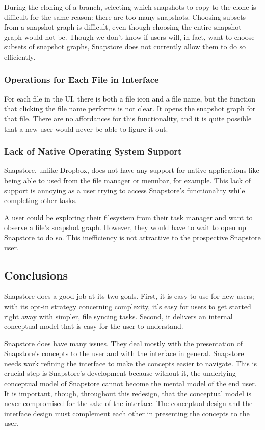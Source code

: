 During the cloning of a branch, selecting which snapshots to copy to the clone is difficult for the same reason: there are too many snapshots. Choosing subsets from a snapshot graph is difficult, even though choosing the entire snapshot graph would not be. Though we don't know if users will, in fact, want to choose subsets of snapshot graphs, Snapstore does not currently allow them to do so efficiently.

\subsubsection{Operations for Each File in Interface}

For each file in the UI, there is both a file icon and a file name, but the function that clicking the file name performs is not clear. It opens the snapshot graph for that file. There are no affordances for this functionality, and it is quite possible that a new user would never be able to figure it out.

\subsubsection{Lack of Native Operating System Support}

Snapstore, unlike Dropbox, does not have any support for native applications like being able to used from the file manager or menubar, for example. This lack of support is annoying as a user trying to access Snapstore's functionality while completing other tasks. 

A user could be exploring their filesystem from their task manager and want to observe a file's snapshot graph. However, they would have to wait to open up Snapstore to do so. This inefficiency is not attractive to the prospective Snapstore user.

\subsection{Conclusions}

Snapstore does a good job at its two goals. First, it is easy to use for new users; with its opt-in strategy concerning complexity, it's easy for users to get started right away with simpler, file syncing tasks. Second, it delivers an internal conceptual model that is easy for the user to understand.

Snapstore does have many issues. They deal mostly with the presentation of Snapstore's concepts to the user and with the interface in general. Snapstore needs work refining the interface to make the concepts easier to navigate. This is crucial step is Snapstore's development because without it, the underlying conceptual model of Snapstore cannot become the mental model of the end user. It is important, though, throughout this redesign, that the conceptual model is never compromised for the sake of the interface. The conceptual design and the interface design must complement each other in presenting the concepts to the user.



